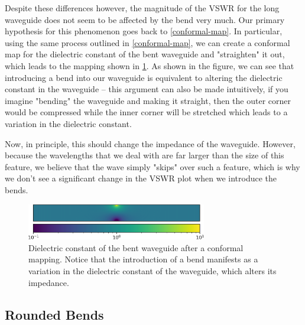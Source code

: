 Despite these differences however, the magnitude of the VSWR for the long waveguide does not seem to be
affected by the bend very much. Our primary hypothesis for this phenomenon goes back to \cref{conformal-map}.
In particular, using the same process outlined in \cref{conformal-map}, we can create a conformal map for the
dielectric constant of the bent waveguide and "straighten" it out, which leads to the mapping shown in
\cref{conformal-color}. As shown in the figure, we can see that introducing a bend into our waveguide is
equivalent to altering the dielectric constant in the waveguide -- this argument can also be made
intuitively, if you imagine "bending" the waveguide and making it straight, then the outer corner would be compressed
while the inner corner will be stretched which leads to a variation in the dielectric constant. 

Now, in principle, this should change the impedance of the waveguide. However, because the wavelengths that
we deal with are far larger than the size of this feature, we believe that the wave simply "skips" over such
a feature, which is why we don't see a significant change in the VSWR plot when we introduce the bends.  

\begin{figure}
	\centering
	\includegraphics[width = 0.7\textwidth]{images/model/straight-color.png}
	\caption{Dielectric constant of the bent waveguide after a conformal mapping. Notice that the
		introduction of a bend manifests as a variation in the dielectric constant of the waveguide, which
	alters its impedance.} 
	\label{conformal-color}
\end{figure}

\subsection{Rounded Bends}
\label{rounded-bend}

